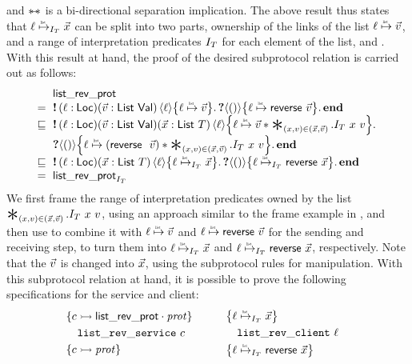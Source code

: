 and $\mathrel{\ast\!\!{-}\!\!\ast}$ is a bi-directional separation implication.
The above result thus states that $\listrefI{\interpvar_\tvar}{\loc}{\vec{\var}}$
can be split into two parts, ownership of the links of the list $\listref{\loc}{\vec\val}$,
and a range of interpretation predicates $I_T$
for each element of the list, and \viceversa.
With this result at hand, the proof of the desired subprotocol relation is
carried out as follows:
\[
\begin{array}{@{} l @{\ } l @{}}
  &\listrevprotname \\
={} &
  \sendprot{(\loc:\Loc)(\vec{\val}:\List\ \Val)}{\loc}{\listref{\loc}{\vec{\val}}}
    \recvprot{}{\TT}{\listref{\loc}{\listrev{\vec{\val}}}}
    \protend \\
\subprotop &
  \sendprot{(\loc:\Loc)(\vec{\val}:\List\ \Val)(\vec{\var}:\List\ \tvar)}{\loc}
    {\listref{\loc}{\vec{\val}} \ast
     \Sep_{(\var,\val) \in (\vec{\var},\vec{\val})}. \interpvar_\tvar\ \var\ \val} \\
  &
  \recvprot{}{\TT}
    {\listref{\loc}{(\listrev\ \vec{\val})} \ast
     \Sep_{(\var,\val) \in (\vec{\var},\vec{\val})}. \interpvar_\tvar\ \var\ \val}
  \protend \\
\subprotop &
  \sendprot{(\loc:\Loc)(\vec{\var}:\List\ \tvar)}{\loc}
    {\listrefI{\interpvar_\tvar}{\loc}{\vec{\var}}}
  \recvprot{}{\TT}
    {\listrefI{\interpvar_\tvar}{\loc}{\listrev{\vec{\var}}}}
  \protend \\
={}& \listrevprotname_{\interpvar_\tvar}
\end{array}
\]
We first frame the range of interpretation predicates owned by the list
$\Sep_{(\var,\val) \in (\vec{\var},\vec{\val})}. \interpvar_\tvar\ \var\ \val$,
using an approach similar to the frame example in ,
and then use  to combine it with $\listref{\loc}{\vec{\val}}$ and
$\listref{\loc}{\listrev{\vec{\val}}}$ for the sending and receiving step,
to turn them into $\listrefI{\interpvar_\tvar}{\loc}{\vec{\var}}$ and
$\listrefI{\interpvar_\tvar}{\loc}{\listrev{\vec{\var}}}$, respectively.
Note that the \binder $\vec{v}$ is changed into $\vec{x}$,
using the subprotocol rules for \binder manipulation.
With this subprotocol relation at hand, it is possible to prove the following
specifications for the service and client:
\[
\begin{array}{c !{\quad} c}
\begin{array}{l}
  \hoareV
  { \interp{\chan}{\protapp {\listrevprotname} {\prot}} }
  { \listrevservicename\ \chan }
  { \interp{\chan}{\prot} }
\end{array}
\qquad
\begin{array}{l}
  \hoareV
  { \listrefI {\interpvar_{\tvar}} \loc {\vec\var} }
  { \listrevclientname\ \loc}
  { \listrefI {\interpvar_{\tvar}} \loc {\listrev \vec\var} }
\end{array}
\end{array}
\]

